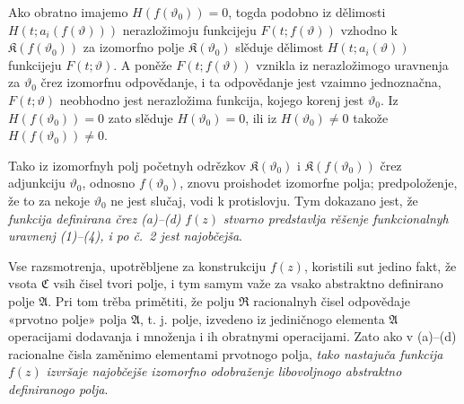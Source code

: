 \documentclass[11pt]{article}
\providecommand{\Afield}{\mathfrak A}
\providecommand{\Cfield}{\mathfrak C}
\providecommand{\Kfield}{\mathfrak K}
\providecommand{\Rfield}{\mathfrak R}
\begin{document}
Ako obratno imajemo \(H(f(\vartheta_0))=0\), togda podobno iz dělimosti \(H(t;a_i(f(\vartheta)))\) nerazložimoju funkcijeju \(F(t;f(\vartheta))\) vzhodno k \(\Kfield(f(\vartheta_0))\) za izomorfno polje \(\Kfield(\vartheta_0)\) slěduje dělimost \(H(t;a_i(\vartheta))\) funkcijeju \(F(t;\vartheta)\). A poněže \(F(t;f(\vartheta))\) vznikla iz nerazložimogo uravnenja za \(\vartheta_0\) črez izomorfnu odpovědanje, i ta odpovědanje jest vzaimno jednoznačna, \(F(t;\vartheta)\) neobhodno jest nerazložima funkcija, kojego korenj jest \(\vartheta_0\). Iz \(H(f(\vartheta_0))=0\) zato slěduje \(H(\vartheta_0)=0\), ili iz \(H(\vartheta_0)\ne0\) takože \(H(f(\vartheta_0))\ne0\).

Tako iz izomorfnyh polj početnyh odrězkov \(\Kfield(\vartheta_0)\) i \(\Kfield(f(\vartheta_0))\) črez adjunkciju \(\vartheta_0\), odnosno \(f(\vartheta_0)\), znovu proishodet izomorfne polja; predpoloženje, že to za nekoje \(\vartheta_0\) ne jest slučaj, vodi k protislovju. Tym dokazano jest, že {\itshape funkcija definirana črez (a)--(d)} \(f(z)\) {\itshape stvarno predstavlja rěšenje funkcionalnyh uravnenj (1)--(4), i po č.~2 jest najobčejša}.

Vse razsmotrenja, upotrěbljene za konstrukciju \(f(z)\), koristili sut jedino fakt, že vsota \(\Cfield\) vsih čisel tvori polje, i tym samym važe za vsako abstraktno definirano polje \(\Afield\). Pri tom trěba primětiti, že polju \(\Rfield\) racionalnyh čisel odpovědaje «prvotno polje» polja \(\Afield\), t. j. polje, izvedeno iz jediničnogo elementa \(\Afield\) operacijami dodavanja i množenja i ih obratnymi operacijami. Zato ako v (a)--(d) racionalne čisla zaměnimo elementami prvotnogo polja, {\itshape tako nastajuča funkcija} \(f(z)\) {\itshape izvršaje najobčejše izomorfno odobraženje libovoljnogo abstraktno definiranogo polja}.
\end{document}

